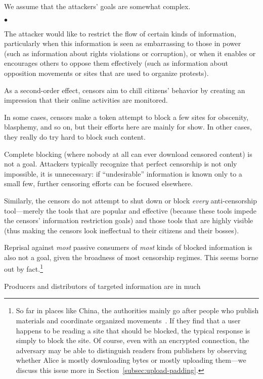 \documentclass{llncs}
\newenvironment{tightlist}{\begin{list}{$\bullet$}{
  \setlength{\itemsep}{0mm}
    \setlength{\parsep}{0mm}
    }}{\end{list}}
\begin{document}
We assume that the attackers' goals are somewhat complex.
\begin{tightlist}
\item The attacker would like to restrict the flow of certain kinds of
  information, particularly when this information is seen as embarrassing to
  those in power (such as information about rights violations or corruption),
  or when it enables or encourages others to oppose them effectively (such as
  information about opposition movements or sites that are used to organize
  protests).
\item As a second-order effect, censors aim to chill citizens' behavior by
  creating an impression that their online activities are monitored.
\item In some cases, censors make a token attempt to block a few sites for
  obscenity, blasphemy, and so on, but their efforts here are mainly for
  show. In other cases, they really do try hard to block such content.
\item Complete blocking (where nobody at all can ever download censored
  content) is not a
  goal. Attackers typically recognize that perfect censorship is not only
  impossible, it is unnecessary: if ``undesirable'' information is known only
  to a small few, further censoring efforts can be focused elsewhere.
\item Similarly, the censors do not attempt to shut down or block {\it
  every} anti-censorship tool---merely the tools that are popular and
  effective (because these tools impede the censors' information restriction
  goals) and those tools that are highly visible (thus making the censors
  look ineffectual to their citizens and their bosses).
\item Reprisal against {\it most} passive consumers of {\it most} kinds of
  blocked information is also not a goal, given the broadness of most
  censorship regimes. This seems borne out by fact.\footnote{So far in places
  like China, the authorities mainly go after people who publish materials
  and coordinate organized movements~\cite{mackinnon-personal}.
  If they find that a
  user happens to be reading a site that should be blocked, the typical
  response is simply to block the site. Of course, even with an encrypted
  connection, the adversary may be able to distinguish readers from
  publishers by observing whether Alice is mostly downloading bytes or mostly
  uploading them---we discuss this issue more in
  Section~\ref{subsec:upload-padding}.}
\item Producers and distributors of targeted information are in much

\end{tightlist}
\end{document}
